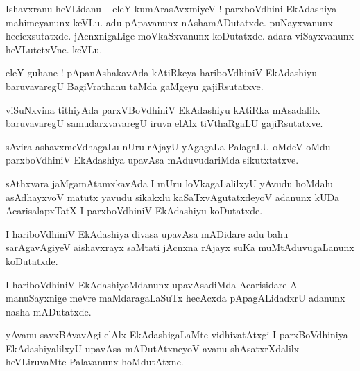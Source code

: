 \documentclass{article}
\begin{document}

\begin{mn}%
Ishavxranu heVLidanu -- eleY kumArasAvxmiyeV ! parxboVdhini EkAdashiya mahimeyanunx keVLu. adu 
pApavanunx nAshamADutatxde. puNayxvanunx hecicxsutatxde. jAcnxnigaLige moVkaSxvanunx koDutatxde. 
adara viSayxvanunx heVLutetxVne. keVLu.
\end{mn}

\begin{mn}%
eleY guhane ! pApanAshakavAda kAtiRkeya hariboVdhiniV EkAdashiyu baruvavaregU BagiVrathanu taMda 
gaMgeyu gajiRsutatxve.
\end{mn}

\begin{mn}%
viSuNxvina tithiyAda parxVBoVdhiniV EkAdashiyu kAtiRka mAsadalilx baruvavaregU samudarxvavaregU 
iruva elAlx tiVthaRgaLU gajiRsutatxve.
\end{mn}

\begin{mn}%
sAvira ashavxmeVdhagaLu nUru rAjayU yAgagaLa PalagaLU oMdeV oMdu parxboVdhiniV EkAdashiya upavAsa 
mAduvudariMda sikutxtatxve.
\end{mn}

\begin{mn}%
sAthxvara jaMgamAtamxkavAda I mUru loVkagaLalilxyU yAvudu hoMdalu asAdhayxvoV matutx yavudu 
sikakxlu kaSaTxvAgutatxdeyoV adanunx kUDa AcarisalapxTatX I parxboVdhiniV EkAdashiyu koDutatxde.
\end{mn}

\begin{mn}%
I hariboVdhiniV EkAdashiya divasa upavAsa mADidare adu bahu sarAgavAgiyeV aishavxrayx saMtati 
jAcnxna rAjayx suKa muMtAduvugaLanunx koDutatxde.
\end{mn}

\begin{mn}%
I hariboVdhiniV EkAdashiyoMdanunx upavAsadiMda Acarisidare A manuSayxnige meVre maMdaragaLaSuTx 
hecAcxda pApagALidadxrU adanunx nasha mADutatxde.
\end{mn}

\begin{mn}%
yAvanu savxBAvavAgi elAlx EkAdashigaLaMte vidhivatAtxgi I parxBoVdhiniya EkAdashiyalilxyU upavAsa 
mADutAtxneyoV avanu shAsatxrXdalilx heVLiruvaMte Palavanunx hoMdutAtxne.
\end{mn}
\end{document}
